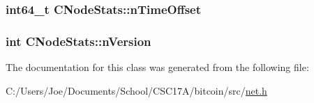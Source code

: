 \subsubsection[{n\+Time\+Offset}]{\setlength{\rightskip}{0pt plus 5cm}int64\+\_\+t C\+Node\+Stats\+::n\+Time\+Offset}\label{class_c_node_stats_a905b33fdcf0443f25fa19ea4d10e8e59}
\hypertarget{class_c_node_stats_ac8892d29d7c246e34e78fbc15ae77276}{}
\subsubsection[{n\+Version}]{\setlength{\rightskip}{0pt plus 5cm}int C\+Node\+Stats\+::n\+Version}\label{class_c_node_stats_ac8892d29d7c246e34e78fbc15ae77276}


The documentation for this class was generated from the following file\+:\begin{DoxyCompactItemize}
\item 
C\+:/\+Users/\+Joe/\+Documents/\+School/\+C\+S\+C17\+A/bitcoin/src/\hyperlink{net_8h}{net.\+h}\end{DoxyCompactItemize}
